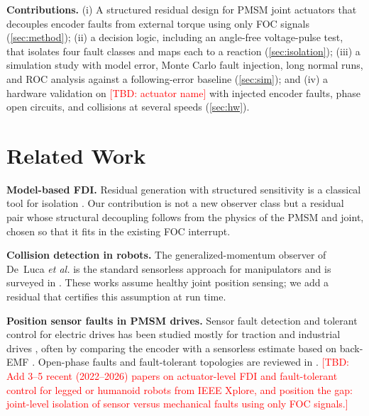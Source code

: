 \documentclass[conference]{IEEEtran}
\newcommand{\TBD}[1]{\textcolor{red}{[TBD: #1]}}
\begin{document}
\textbf{Contributions.}
(i) A structured residual design for PMSM joint actuators that decouples
encoder faults from external torque using only FOC signals
(\cref{sec:method}); (ii) a decision logic, including an angle-free
voltage-pulse test, that isolates four fault classes and maps each to a
reaction (\cref{sec:isolation}); (iii) a simulation study with model error,
Monte Carlo fault injection, long normal runs, and ROC analysis against a
following-error baseline (\cref{sec:sim}); and (iv) a hardware validation on
\TBD{actuator name} with injected encoder faults, phase open circuits, and
collisions at several speeds (\cref{sec:hw}).

\section{Related Work}
\label{sec:related}

\textbf{Model-based FDI.} Residual generation with structured sensitivity is a
classical tool for isolation
\cite{gertler1998fault,chen1999robust,isermann2006fault,blanke2016diagnosis}.
Our contribution is not a new observer class but a residual pair whose
structural decoupling follows from the physics of the PMSM and joint, chosen
so that it fits in the existing FOC interrupt.

\textbf{Collision detection in robots.} The generalized-momentum observer of
De~Luca \emph{et al.} \cite{deluca2003actuator,deluca2006collision} is the
standard sensorless approach for manipulators and is surveyed in
\cite{haddadin2017collisions}. These works assume healthy joint position
sensing; we add a residual that certifies this assumption at run time.

\textbf{Position sensor faults in PMSM drives.} Sensor fault detection and
tolerant control for electric drives has been studied mostly for traction and
industrial drives \cite{akrad2011fault,bourogaoui2016speed}, often by comparing
the encoder with a sensorless estimate based on back-EMF
\cite{chen2003extended,matsui1996sensorless}. Open-phase faults and
fault-tolerant topologies are reviewed in \cite{welchko2004fault}.
\TBD{Add 3--5 recent (2022--2026) papers on actuator-level FDI and
fault-tolerant control for legged or humanoid robots from IEEE Xplore, and
position the gap: joint-level isolation of sensor versus mechanical faults
using only FOC signals.}

\end{document}
